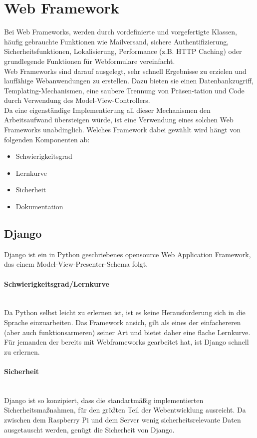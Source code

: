 \documentclass[11pt]{article}
\begin{document}
\section{Web Framework}
Bei Web Frameworks, werden durch vordefinierte und vorgefertigte Klassen, h\"aufig gebrauchte Funktionen wie Mailversand, sichere Authentifizierung, Sicherheitsfunktionen, Lokalisierung, Performance (z.B. HTTP Caching) oder grundlegende Funktionen f\"ur Webformulare vereinfacht. \\
Web Frameworks sind darauf ausgelegt, sehr schnell Ergebnisse zu erzielen und lauff\"ahige Webanwendungen zu erstellen. Dazu bieten sie einen Datenbankzugriff, Templating-Mechanismen, eine saubere Trennung von Pr\"asen-tation und Code durch Verwendung des Model-View-Controllers. \\
Da eine eigenst\"andige Implementierung all dieser Mechanismen den Arbeitsaufwand \"ubersteigen w\"urde, ist eine Verwendung eines solchen Web Frameworks unabdinglich. Welches Framework dabei gew\"ahlt wird h\"angt von folgenden Komponenten ab:
\begin{itemize}
\item Schwierigkeitsgrad
\item Lernkurve
\item Sicherheit
\item Dokumentation
\end{itemize}
\newpage
\subsection{Django}
Django ist ein in Python geschriebenes opensource Web Application Framework, das einem Model-View-Presenter-Schema folgt.
\paragraph{Schwierigkeitsgrad/Lernkurve} \mbox{}\\
Da Python selbst leicht zu erlernen ist, ist es keine Herausforderung sich in die Sprache einzuarbeiten. Das Framework ansich, gilt als eines der einfachereren (aber auch funktionsarmeren) seiner Art und bietet daher eine flache Lernkurve. F\"ur jemanden der bereits mit Webframeworks gearbeitet hat, ist Django schnell zu erlernen.
\paragraph{Sicherheit} \mbox{}\\
Django ist so konzipiert, dass die standartm\"a{\ss}ig implementierten Sicherheitsma{\ss}nahmen, f\"ur den gr\"o{\ss}ten Teil der Webentwicklung ausreicht. Da zwischen dem Raspberry Pi und dem Server wenig sicherheitsrelevante Daten ausgetauscht werden, gen\"ugt die Sicherheit von Django.
\end{document}

